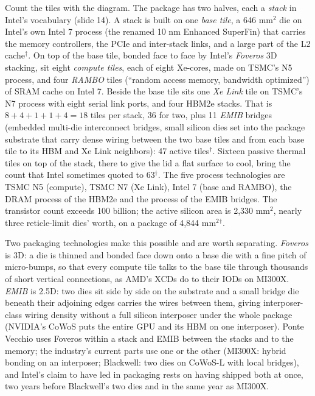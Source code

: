 \documentclass[11pt,letterpaper]{article}
\begin{document}
Count the tiles with the diagram. The package has two halves, each a \emph{stack} in Intel's vocabulary (slide 14). A stack is built on one \emph{base tile}, a 646 mm$^2$ die on Intel's own Intel 7 process (the renamed 10 nm Enhanced SuperFin) that carries the memory controllers, the PCIe and inter-stack links, and a large part of the L2 cache$^\dagger$. On top of the base tile, bonded face to face by Intel's \emph{Foveros} 3D stacking, sit eight \emph{compute tiles}, each of eight Xe-cores, made on TSMC's N5 process, and four \emph{RAMBO} tiles (``random access memory, bandwidth optimized'') of SRAM cache on Intel 7. Beside the base tile sits one \emph{Xe Link} tile on TSMC's N7 process with eight serial link ports, and four HBM2e stacks. That is $8 + 4 + 1 + 1 + 4 = 18$ tiles per stack, 36 for two, plus 11 \emph{EMIB} bridges (embedded multi-die interconnect bridges, small silicon dies set into the package substrate that carry dense wiring between the two base tiles and from each base tile to its HBM and Xe Link neighbors): 47 active tiles$^\dagger$. Sixteen passive thermal tiles on top of the stack, there to give the lid a flat surface to cool, bring the count that Intel sometimes quoted to 63$^\dagger$. The five process technologies are TSMC N5 (compute), TSMC N7 (Xe Link), Intel 7 (base and RAMBO), the DRAM process of the HBM2e and the process of the EMIB bridges. The transistor count exceeds 100 billion; the active silicon area is 2{,}330 mm$^2$, nearly three reticle-limit dies' worth, on a package of 4{,}844 mm$^2$$^\dagger$.

Two packaging technologies make this possible and are worth separating. \emph{Foveros} is 3D: a die is thinned and bonded face down onto a base die with a fine pitch of micro-bumps, so that every compute tile talks to the base tile through thousands of short vertical connections, as AMD's XCDs do to their IODs on MI300X. \emph{EMIB} is 2.5D: two dies sit side by side on the substrate and a small bridge die beneath their adjoining edges carries the wires between them, giving interposer-class wiring density without a full silicon interposer under the whole package (NVIDIA's CoWoS puts the entire GPU and its HBM on one interposer). Ponte Vecchio uses Foveros within a stack and EMIB between the stacks and to the memory; the industry's current parts use one or the other (MI300X: hybrid bonding on an interposer; Blackwell: two dies on CoWoS-L with local bridges), and Intel's claim to have led in packaging rests on having shipped both at once, two years before Blackwell's two dies and in the same year as MI300X.
\end{document}
